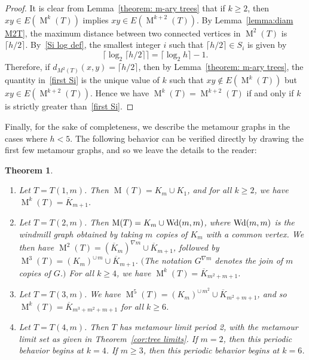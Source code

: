\documentclass[12pt]{amsart}
\newtheorem{theorem}{Theorem}[section]
\theoremstyle{definition}
\theoremstyle{remark}
\numberwithin{equation}{section}
\numberwithin{figure}{section}
\newcommand{\M}{\operatorname{M}}
\begin{document}
\begin{proof}
    It is clear from Lemma~\ref{theorem: m-ary trees} that if $k \geq 2$, then $xy \in E(\M^k(T))$ implies $xy \in E(\M^{k+2}(T))$.
    By Lemma~\ref{lemma:diam M2T}, the maximum distance between two connected vertices in $\M^2(T)$ is $\lceil h/2 \rceil$.
    By~\eqref{Si log def}, the smallest integer $i$ such that $\lceil h/2 \rceil \in S_i$ is given by
    \begin{equation}
        \label{first Si}
    \Big\lceil \log_2 \lceil h/2 \rceil \Big\rceil = \lceil \log_2 h \rceil - 1.
    \end{equation}
    Therefore, if $d_{M^2(T)}(x,y) = \lceil h/2 \rceil$, then by Lemma~\ref{theorem: m-ary trees}, the quantity in~\eqref{first Si} is the unique value of $k$ such that $xy \not\in E(\M^k(T))$ but $xy \in E(\M^{k+2}(T))$. 
    Hence we have $\M^{k}(T) = \M^{k+2}(T)$ if and only if $k$ is strictly greater than~\eqref{first Si}.
\end{proof}

Finally, for the sake of completeness, we describe the metamour graphs in the cases where $h < 5$.
The following behavior can be verified directly by drawing the first few metamour graphs, and so we leave the details to the reader:

\begin{theorem}\

\begin{enumerate}
    \item Let $T = T(1,m)$.
    Then $\M(T) = K_m \cup K_1$, and for all $k \geq 2$, we have $\M^k(T) = \overline{K}_{m+1}$.

    \item Let $T = T(2,m)$.
    Then $\M(T) = K_m \cup {\rm Wd}(m,m)$, where ${\rm Wd}(m,m)$ is the windmill graph obtained by taking $m$ copies of $K_m$ with a common vertex.
    We then have $\M^2(T) = (\overline{K}_m)^{\nabla m} \cup \overline{K}_{m+1}$, followed by $\M^3(T) = (K_m)^{\cup\, m} \cup \overline{K}_{m+1}$.
    $($The notation $G^{\nabla m}$ denotes the join of $m$ copies of $G$.$)$
    For all $k \geq 4$, we have $\M^k(T) = \overline{K}_{m^2 + m + 1}$.
    \item Let $T = T(3,m)$.
    We have $\M^5(T) = (K_m)^{\cup\, m^2} \cup \overline{K}_{m^2 + m + 1}$, and so $\M^k(T) = \overline{K}_{m^3+m^2+m+1}$ for all $k \geq 6$.
    \item Let $T = T(4,m)$.
    Then $T$ has metamour limit period 2, with the metamour limit set as given in Theorem~\ref{cor:tree limits}.
    If $m=2$, then this periodic behavior begins at $k = 4$.
    If $m \geq 3$, then this periodic behavior begins at $k = 6$.
    
\end{enumerate}
    
\end{theorem}
\end{document}
